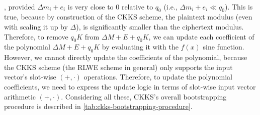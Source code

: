$ $


, provided $\Delta m_i + e_i$ is very close to 0 relative to $q_0$ (i.e., $\Delta m_i + e_i \ll q_0$). This is true, because by construction of the CKKS scheme, the plaintext modulus (even with scaling it up by $\Delta$), is significantly smaller than the ciphertext modulus. Therefore, to remove $q_0K$ from $\Delta M + E + q_0K$, we can update each coefficient of the polynomial $\Delta M + E + q_0K$ by evaluating it with the $f(x)$ sine function. However, we cannot directly update the coefficients of the polynomial, because the CKKS scheme (the RLWE scheme in general) only supports the input vector's slot-wise $(+, \cdot)$ operations. Therefore, to update the polynomial coefficients, we need to express the update logic in terms of slot-wise input vector arithmetic $(+, \cdot)$. Considering all these, CKKS's overall bootstrapping procedure is described in \autoref{tab:ckks-bootstrapping-procedure}.

